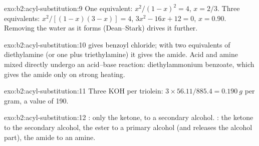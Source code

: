 \begin{solution}{exo:b2:acyl-substitution:9}
One equivalent: $x^2/(1 - x)^2 = 4$, $x = 2/3$. Three equivalents: $x^2/[(1 - x)(3 - x)] = 4$, $3x^2 - 16x
+ 12 = 0$, $x = 0.90$. Removing the water as it forms (Dean--Stark) drives it further.
\end{solution}

\begin{solution}{exo:b2:acyl-substitution:10}
 gives benzoyl chloride; with two equivalents of diethylamine (or one plus triethylamine)
it gives the amide. Acid and amine mixed directly undergo an acid--base reaction: diethylammonium
benzoate, which gives the amide only on strong heating.
\end{solution}

\begin{solution}{exo:b2:acyl-substitution:11}
Three KOH per triolein: $3 \times 56.11/885.4 = \qty{0.190}{g}$ per gram, a  value of
190.
\end{solution}

\begin{solution}{exo:b2:acyl-substitution:12}
: only the ketone, to a secondary alcohol. : the ketone to the secondary
alcohol, the ester to a primary alcohol (and releases the alcohol part), the amide to an amine.
\end{solution}

